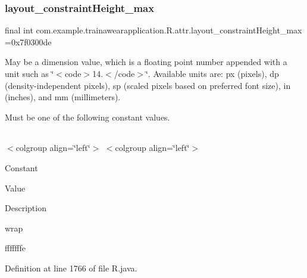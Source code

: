 \mbox{\label{classcom_1_1example_1_1trainawearapplication_1_1_r_1_1attr_a048a20d4f81ed64001ae31f0e603e1b1}} 
\subsubsection{\texorpdfstring{layout\_constraintHeight\_max}{layout\_constraintHeight\_max}}
{\footnotesize\ttfamily final int com.\+example.\+trainawearapplication.\+R.\+attr.\+layout\+\_\+constraint\+Height\+\_\+max =0x7f0300de\hspace{0.3cm}{\ttfamily [static]}}

May be a dimension value, which is a floating point number appended with a unit such as \char`\"{}$<$code$>$14.\+5sp$<$/code$>$\char`\"{}. Available units are\+: px (pixels), dp (density-\/independent pixels), sp (scaled pixels based on preferred font size), in (inches), and mm (millimeters). 

Must be one of the following constant values.

\tabulinesep=1mm
\begin{longtabu}spread 0pt [c]{*{0}{|X[-1]}|}
\hline
\end{longtabu}
$<$colgroup align=\char`\"{}left\char`\"{}$>$ $<$colgroup align=\char`\"{}left\char`\"{}$>$ 

Constant

Value

Description 

wrap

fffffffe

Definition at line 1766 of file R.\+java.

\mbox{\label{classcom_1_1example_1_1trainawearapplication_1_1_r_1_1attr_a2f26a120e3a1ea7b80c756f1e1378da8}} 
